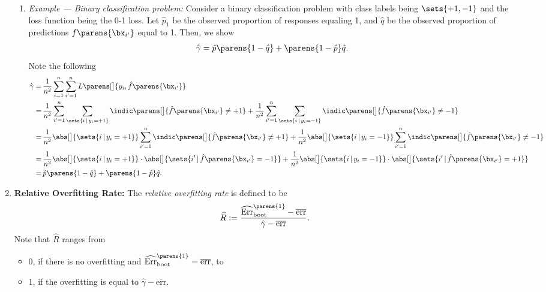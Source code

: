 \documentclass[12pt]{article}
\begin{document}
\begin{enumerate}[label=\textbf{\arabic*.}]
\begin{enumerate}
		\item \textit{Example --- Binary classification problem:} Consider a binary classification problem with class labels being $\sets{+1, -1}$ and the loss function being the 0-1 loss. Let $\hat{p}_1$ be the observed proportion of responses equaling 1, and $\hat{q}$ be the observed proportion of predictions $f \parens{\bx_{i'}}$ equal to 1. Then, we show 
		\begin{align*}
			\hat{\gamma} = \hat{p} \parens{1 - \hat{q}} + \parens{1 - \hat{p}} \hat{q}. 
		\end{align*}
		Note the following 
		\begin{align*}
			\hat{\gamma} = & \, \frac{1}{n^2} \sum_{i=1}^n \sum_{i'=1}^n L \parens[\big]{y_i, \hat{f} \parens{\bx_{i'}} } \\ 
			= & \, \frac{1}{n^2} \sum_{i'=1}^n \sum_{\sets{i \,\vert\, y_i = +1}} \indic \parens[\big]{\hat{f} \parens{\bx_{i'}} \neq +1} + \frac{1}{n^2} \sum_{i'=1}^n \sum_{\sets{i \,\vert\, y_i = -1}} \indic \parens[\big]{\hat{f} \parens{\bx_{i'}} \neq -1} \\ 
			= & \, \frac{1}{n^2} \abs[\big]{\sets{i \,\vert\, y_i = +1}} \sum_{i'=1}^n \indic \parens[\big]{\hat{f} \parens{\bx_{i'}} \neq +1} + \frac{1}{n^2} \abs[\big]{\sets{i \,\vert\, y_i = -1}} \sum_{i'=1}^n \indic \parens[\big]{\hat{f} \parens{\bx_{i'}} \neq -1} \\ 
			= & \, \frac{1}{n^2} \abs[\big]{\sets{i \,\vert\, y_i = +1}} \cdot \abs[\big]{\sets{i' \,\vert\, \hat{f} \parens{\bx_{i'}} = -1}} + \frac{1}{n^2} \abs[\big]{\sets{i \,\vert\, y_i = -1}} \cdot \abs[\big]{\sets{i' \,\vert\, \hat{f} \parens{\bx_{i'}} = +1}} \\ 
			= & \, \hat{p} \parens{1 - \hat{q}} + \parens{1 - \hat{p}} \hat{q}. 
		\end{align*}
	\end{enumerate}
	
	\item \textbf{Relative Overfitting Rate:} The \textit{relative overfitting rate} is defined to be 
	\begin{align}
		\widehat{R} := \frac{\widehat{\mathrm{Err}}^{\parens{1}}_{\mathrm{boot}} - \overline{\mathrm{err}} }{\hat{\gamma} - \overline{\mathrm{err}} }. 
	\end{align}
	Note that $\widehat{R}$ ranges from 
	\begin{itemize}
		\item 0, if there is no overfitting and $\widehat{\mathrm{Err}}^{\parens{1}}_{\mathrm{boot}} = \overline{\mathrm{err}}$, to 
		\item 1, if the overfitting is equal to $\hat{\gamma} - \overline{\mathrm{err}}$. 
	\end{itemize}
	

\end{enumerate}
\end{document}
